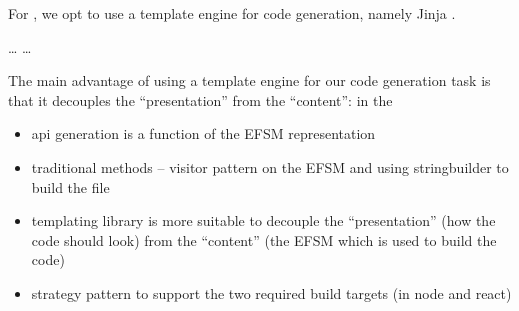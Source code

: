 For , we opt to use a template engine for code
generation, namely Jinja \cite{jinja}.

\dots %
\dots %

The main advantage of using a template engine for 
our code generation task is that it decouples the ``presentation''
from the ``content'': in the 

\begin{itemize}
\item api generation is a function of the EFSM representation
\item traditional methods -- visitor pattern on the EFSM and using stringbuilder to build the file
\item templating library is more suitable to decouple the ``presentation'' (how the code should look) from the ``content'' (the EFSM which is used to build the code)
\item strategy pattern to support the two required build targets (in node and react)
\end{itemize}